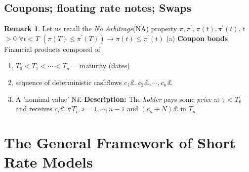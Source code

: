 \documentclass[10pt, oneside, reqno]{amsbook}
\theoremstyle{plain}%
\theoremstyle{definition}
\theoremstyle{rem}
\newtheorem*{rem}{Remark}
\theoremstyle{definition}
\newcommand{\lt}{<}
\numberwithin{equation}{chapter}
\begin{document}
\section{Coupons; floating rate notes; Swaps}
\begin{rem}
Let us recall the \textit{No Arbitrage}(NA) property $\pi, \pi^{'}$, $\pi(t), \pi^{'}(t)$,
t $>$0 $\forall t \lt T$ 
\newline $(\pi(T) \leq \pi^{'}(T)) \longrightarrow \pi(t) \leq \pi^{'}(t) $
(a) \textbf{Coupon bonds} Financial products composed of 
\begin{enumerate} 
 \item $T_0 \lt T_1 \lt \cdots \lt T_n$ = maturity (dates)
\item sequence of deterministic cashflows $c_1 \pounds, c_2 \pounds, \cdots , c_n \pounds$
\item A 'nominal value' N\pounds 
\newline \textbf{Description:} The \textit{holder} pays some \textit{price} at t < $T_0$ and receives $c_i\pounds$ 
$\forall
T_i$, $i=1,\cdots, n-1$ and $(c_n + N)\pounds$ in $T_n$
\end{enumerate}
\end{rem}

\chapter{The General Framework of Short Rate Models}
\end{document}

